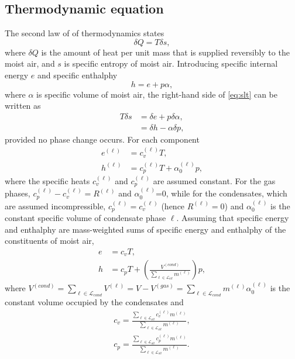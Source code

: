 \documentclass{agujournal}
\begin{document}
{\subsection{Thermodynamic equation}\label{sec:teqn}
The second law of of thermodynamics states
\begin{equation}
\delta Q=T\delta s,\label{eq:slt}
\end{equation}
where $\delta Q$ is the amount of heat per unit mass that is supplied reversibly to the moist air, and $s$ is specific entropy of moist air. Introducing specific internal energy $e$ and specific enthalphy 
\begin{equation}
h=e+p\alpha,\label{eq:enthalphy}
\end{equation}
where $\alpha$ is specific volume of moist air, the right-hand side of \eqref{eq:slt} can be written as
\begin{align}
T\delta s &=\delta e+p\delta \alpha,\\
          &=\delta h-\alpha \delta p,\label{eq:TdS}
\end{align}
provided no phase change occurs. For each component
\begin{align}
e^{(\ell)}&=c^{(\ell)}_vT,\\
h^{(\ell)}&=c^{(\ell)}_pT+\alpha^{(\ell)}_0p,
\end{align}
where the specific heats $c_v^{(\ell)}$ and $c_p^{(\ell)}$ are assumed constant. For the gas phases, $c_p^{(\ell)}-c_v^{(\ell)}=R^{(\ell)}$ and $\alpha_0^{(\ell)}$=0, while for the condensates, which are assumed incompressible, $c_p^{(\ell)}=c_v^{(\ell)}$ (hence $R^{(\ell)}=0$) and $\alpha_0^{(\ell)}$ is the constant specific volume of condensate phase $\ell$. Assuming that specific energy and enthalphy are mass-weighted sums of specific energy and enthalphy of the constituents of moist air,
\begin{align}
e&=c_vT,\label{eq:e}\\
h&=c_pT+\left(\frac{V^{(cond)}}{\sum_{\ell \in \mathcal{L}_{all}}m^{(\ell)}}\right) p\label{eq:h},
\end{align}
where $V^{(cond)}=\sum_{\ell \in \mathcal{L}_{cond}} V^{(\ell)}=V-V^{(gas)}=\sum_{\ell \in \mathcal{L}_{cond}}m^{(\ell)}\alpha^{(\ell)}_0$ is the constant volume occupied by the condensates and
\begin{align}
c_v=\frac{\sum_{\ell \in \mathcal{L}_{all}} c_v^{(\ell)}m^{(\ell)}}{\sum_{\ell \in \mathcal{L}_{all}} m^{(\ell)}},\\
c_p=\frac{\sum_{\ell \in \mathcal{L}_{all}} c_p^{(\ell)}m^{(\ell)}}{\sum_{\ell \in \mathcal{L}_{all}} m^{(\ell)}}.\label{eq:cp}

\end{align}}
\end{document}
